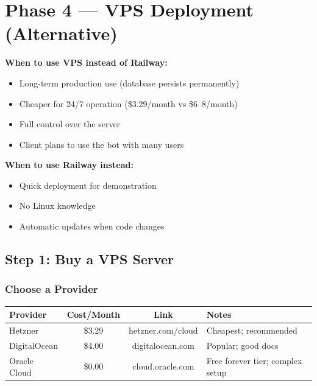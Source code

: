 
\chapter{Phase 4 --- VPS Deployment (Alternative)}

\begin{infobox}
\textbf{When to use VPS instead of Railway:}
\begin{itemize}
    \item Long-term production use (database persists permanently)
    \item Cheaper for 24/7 operation (\$3.29/month vs \$6--8/month)
    \item Full control over the server
    \item Client plans to use the bot with many users
\end{itemize}
\textbf{When to use Railway instead:}
\begin{itemize}
    \item Quick deployment for demonstration
    \item No Linux knowledge
    \item Automatic updates when code changes
\end{itemize}
\end{infobox}

\section{Step 1: Buy a VPS Server}

\subsection{Choose a Provider}

\begin{table}[H]
\centering
\begin{tabularx}{\textwidth}{|l|c|c|X|}
\hline
\textbf{Provider} & \textbf{Cost/Month} & \textbf{Link} & \textbf{Notes} \\
\hline
Hetzner & \$3.29 & hetzner.com/cloud & Cheapest; recommended \\
\hline
DigitalOcean & \$4.00 & digitalocean.com & Popular; good docs \\
\hline
Oracle Cloud & \$0.00 & cloud.oracle.com & Free forever tier; complex setup \\
\hline
\end{tabularx}
\end{table}


